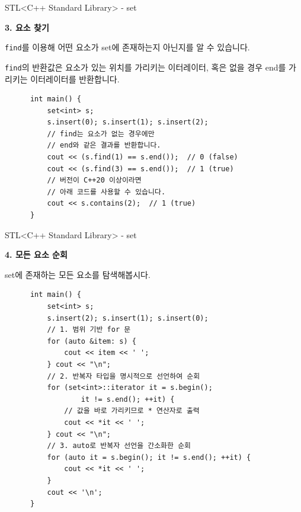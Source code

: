 \begin{frame}[fragile]{STL}{<C++ Standard Library> - set}
  \begin{twocol}
    \vspace{2mm}
    \textbf{3. 요소 찾기}\par\vspace{2mm}
    \texttt{find}를 이용해 어떤 요소가 set에 존재하는지 아닌지를 알 수 있습니다.\par\vspace{2mm}
    \texttt{find}의 반환값은 요소가 있는 위치를 가리키는 이터레이터, 혹은 없을 경우
    end를 가리키는 이터레이터를 반환합니다.\par\vspace{2mm}
  \colsplit
    \begin{verbatim}
      int main() {
          set<int> s;
          s.insert(0); s.insert(1); s.insert(2);
          // find는 요소가 없는 경우에만
          // end와 같은 결과를 반환합니다.
          cout << (s.find(1) == s.end());  // 0 (false)
          cout << (s.find(3) == s.end());  // 1 (true)
          // 버전이 C++20 이상이라면
          // 아래 코드를 사용할 수 있습니다.
          cout << s.contains(2);  // 1 (true)
      }
    \end{verbatim}
  \end{twocol}
\end{frame}

\begin{frame}[fragile]{STL}{<C++ Standard Library> - set}
  \begin{twocol}
    \vspace{8mm}
    \textbf{4. 모든 요소 순회}\par\vspace{2mm}
    set에 존재하는 모든 요소를 탐색해봅시다.
  \colsplit
    \begin{verbatim}
      int main() {
          set<int> s;
          s.insert(2); s.insert(1); s.insert(0);
          // 1. 범위 기반 for 문
          for (auto &item: s) {
              cout << item << ' ';
          } cout << "\n";
          // 2. 반복자 타입을 명시적으로 선언하여 순회
          for (set<int>::iterator it = s.begin();
                  it != s.end(); ++it) {
              // 값을 바로 가리키므로 * 연산자로 출력
              cout << *it << ' ';
          } cout << "\n";
          // 3. auto로 반복자 선언을 간소화한 순회
          for (auto it = s.begin(); it != s.end(); ++it) {
              cout << *it << ' ';
          }
          cout << '\n';
      }
    \end{verbatim}
  \end{twocol}
\end{frame}

